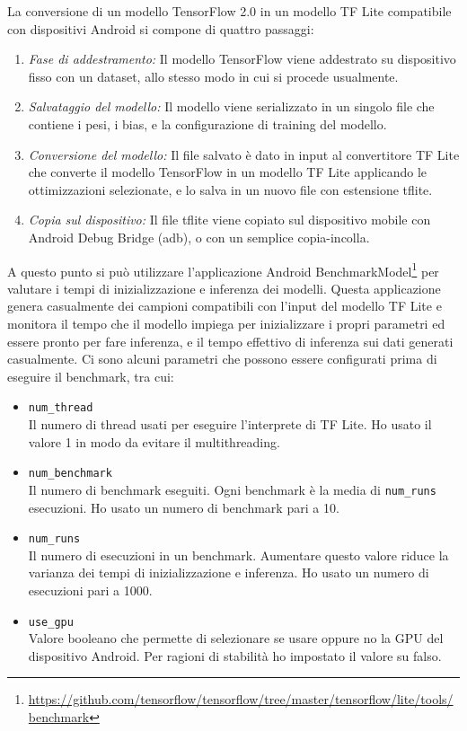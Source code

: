\documentclass[12pt,italian]{report}
\begin{document}
La conversione di un modello TensorFlow 2.0 in un modello TF Lite compatibile con dispositivi Android si compone di quattro passaggi:
\begin{enumerate}
\item \textit{Fase di addestramento:} Il modello TensorFlow viene addestrato su dispositivo fisso con un dataset, allo stesso modo in cui si procede usualmente.

\item \textit{Salvataggio del modello:} Il modello viene serializzato in un singolo file che contiene i pesi, i bias, e la configurazione di training del modello.

\item \textit{Conversione del modello:} Il file salvato è dato in input al convertitore TF Lite che converte il modello TensorFlow in un modello TF Lite applicando le ottimizzazioni selezionate, e lo salva in un nuovo file con estensione tflite.

\item \textit{Copia sul dispositivo:} Il file tflite viene copiato sul dispositivo mobile con  Android Debug Bridge (adb), o con un semplice copia-incolla.
\end{enumerate}

\noindent A questo punto si può utilizzare l'applicazione Android BenchmarkModel\footnote{\url{https://github.com/tensorflow/tensorflow/tree/master/tensorflow/lite/tools/benchmark}} per valutare i tempi di inizializzazione e inferenza dei modelli. Questa applicazione genera casualmente dei campioni compatibili con l'input del modello TF Lite e monitora il tempo che il modello impiega per inizializzare i propri parametri ed essere pronto per fare inferenza, e il tempo effettivo di inferenza sui dati generati casualmente. Ci sono alcuni parametri che possono essere configurati prima di eseguire il benchmark, tra cui:
\begin{itemize}
\item \texttt{num\_thread} \\ Il numero di thread usati per eseguire l'interprete di TF Lite. Ho usato il valore 1 in modo da evitare il multithreading.
\item \texttt{num\_benchmark} \\ Il numero di benchmark eseguiti. Ogni benchmark è la media di \texttt{num\_runs} esecuzioni. Ho usato un numero di benchmark pari a 10.
\item \texttt{num\_runs} \\ Il numero di esecuzioni in un benchmark. Aumentare questo valore riduce la varianza dei tempi di inizializzazione e inferenza. Ho usato un numero di esecuzioni pari a 1000.
\item \texttt{use\_gpu} \\ Valore booleano che permette di selezionare se usare oppure no la GPU del dispositivo Android. Per ragioni di stabilità ho impostato il valore su falso.
\end{itemize}
\end{document}

